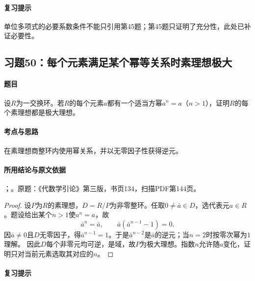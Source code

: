 \paragraph{复习提示}

单位多项式的必要系数条件不能只引用第45题；第45题只证明了充分性，此处已补证必要性。



\subsection{习题50：每个元素满足某个幂等关系时素理想极大}

\label{ex:3:50}

\paragraph{题目}

设$R$为一交换环。若$R$的每个元素$a$都有一个适当方幂$a^n=a$（$n>1$），证明$R$的每个素理想都是极大理想。

\paragraph{考点与思路}

在素理想商整环内使用幂关系，并以无零因子性获得逆元。

\paragraph{所用结论与原文依据}

；。原题：《代数学引论》第三版，书页134，扫描PDF第144页。


\begin{proof}

设$P$为$R$的素理想，$D=R/P$为非零整环。任取$0\ne\bar a\in D$，选代表元$a\in R$。题设给出某个$n>1$使$a^n=a$，故
\[
\bar a^n=\bar a,\qquad \bar a(\bar a^{n-1}-1)=0.
\]
因$\bar a\ne0$且$D$无零因子，得$\bar a^{n-1}=1$。于是$\bar a^{n-2}$是$\bar a$的逆元；当$n=2$时按零次幂为$1$理解。
因此$D$每个非零元均可逆，是域，故$P$为极大理想。指数$n$允许随$a$变化，证明只对当前元素选取其对应的$n$。

\end{proof}

\paragraph{复习提示}

